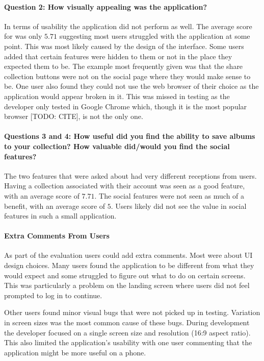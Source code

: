 \paragraph{Question 2: How visually appealing was the application?}
In terms of usability the application did not perform as well. The average score for was only $5.71$ suggesting most users struggled with the application at some point. This was most likely caused by the design of the interface. Some users added that certain features were hidden to them or not in the place they expected them to be. The example most frequently given was that the share collection buttons were not on the social page where they would make sense to be. One user also found they could not use the web browser of their choice as the application would appear broken in it. This was missed in testing as the developer only tested in Google Chrome which, though it is the most popular browser [TODO: CITE], is not the only one.

\paragraph{Questions 3 and 4: How useful did you find the ability to save albums to your collection? How valuable did/would you find the social features?}
The two features that were asked about had very different receptions from users. Having a collection associated with their account was seen as a good feature, with an average score of $7.71$. The social features were not seen as much of a benefit, with an average score of $5$. Users likely did not see the value in social features in such a small application.

\paragraph{Extra Comments From Users}
As part of the evaluation users could add extra comments. Most were about UI design choices. Many users found the application to be different from what they would expect and some struggled to figure out what to do on certain screens. This was particularly a problem on the landing screen where users did not feel prompted to log in to continue.

Other users found minor visual bugs that were not picked up in testing. Variation in screen sizes was the most common cause of these bugs. During development the developer focused on a single screen size and resolution (16:9 aspect ratio). This also limited the application's usability with one user commenting that the application might be more useful on a phone.

